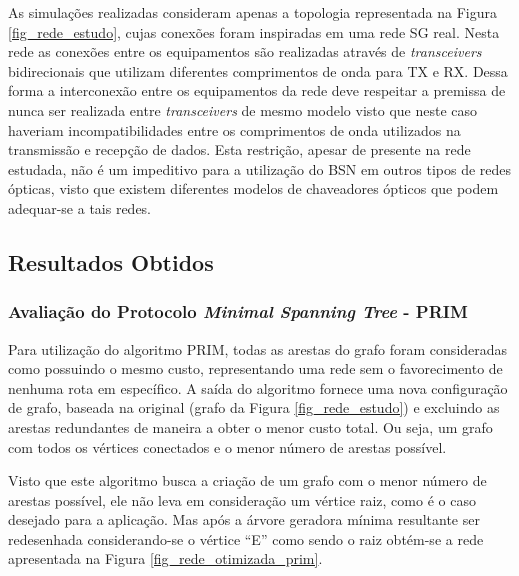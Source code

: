 \documentclass[12pt]{article}
\begin{document}
As simulações realizadas consideram apenas a topologia representada na Figura \ref{fig_rede_estudo}, cujas conexões foram inspiradas em uma rede SG real. Nesta rede as conexões entre os equipamentos são realizadas através de \emph{transceivers} bidirecionais que utilizam diferentes comprimentos de onda para TX e RX. Dessa forma a interconexão entre os equipamentos da rede deve respeitar a premissa de nunca ser realizada entre \emph{transceivers} de mesmo modelo visto que neste caso haveriam incompatibilidades entre os comprimentos de onda utilizados na transmissão e recepção de dados. Esta restrição, apesar de presente na rede estudada, não é um impeditivo para a utilização do BSN em outros tipos de redes ópticas, visto que existem diferentes modelos de chaveadores ópticos que podem adequar-se a tais redes.

\subsection{Resultados Obtidos}
\label{sec:resultados}
\subsubsection{Avaliação do Protocolo \emph{Minimal Spanning Tree} - PRIM}
\label{sec:minimal_spanning_tree}
Para utilização do algoritmo PRIM, todas as arestas do grafo foram consideradas como possuindo o mesmo custo, representando uma rede sem o favorecimento de nenhuma rota em específico. A saída do algoritmo fornece uma nova configuração de grafo, baseada na original (grafo da Figura \ref{fig_rede_estudo}) e excluindo as arestas redundantes de maneira a obter o menor custo total. Ou seja, um grafo com todos os vértices conectados e o menor número de arestas possível.

Visto que este algoritmo busca a criação de um grafo com o menor número de arestas possível, ele não leva em consideração um vértice raiz, como é o caso desejado para a aplicação. Mas após a árvore geradora mínima resultante ser redesenhada considerando-se o vértice ``E'' como sendo o raiz obtém-se a rede apresentada na Figura \ref{fig_rede_otimizada_prim}.
\end{document}

